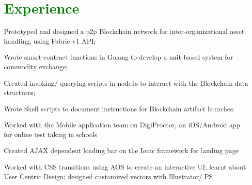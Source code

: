 \documentclass[letterpaper]{deedy-resume-openfont} %
\begin{document}
\begin{minipage}[t]{0.66\textwidth} %


\section{\textcolor{GREEN}{Experience}}

\vspace{\topsep} %
\begin{tightemize}
\item Prototyped and designed a p2p Blockchain network for inter-organizational asset handling, using Fabric v1 API;
\item Wrote smart-contract functions in Golang to develop a unit-based system for commodity exchange;
\item Created invoking/ querying scripts in nodeJs to interact with the Blockchain data structures;
\item Wrote Shell scripts to document instructions for Blockchain artifact launches.
\end{tightemize}

\sectionsep %

\begin{tightemize}
\item Worked with the Mobile application team on DigiProctor, an iOS/Android app for online test taking in schools
\item Created AJAX dependent loading bar on the Ionic framework for landing page
\item Worked with CSS transitions using AOS to create an interactive UI; learnt about User Centric Design; designed customized vectors with Illustrator/ PS 
\end{tightemize}

\sectionsep %



\end{minipage}
\end{document}
